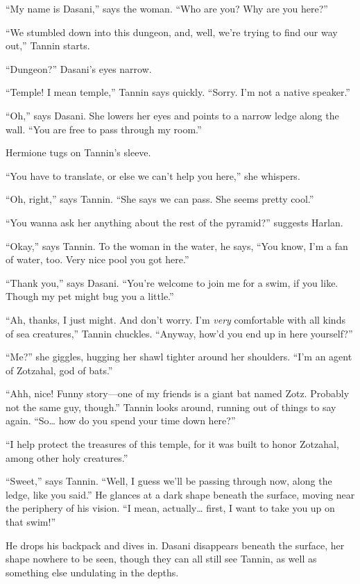 \documentclass[smalldemyvopaper,11pt,twoside,onecolumn,openright,extrafontsizes]{memoir}
\newlength\drop
\begin{document}
``My name is Dasani,'' says the woman. ``Who are you? Why are you
here?''

``We stumbled down into this dungeon, and, well, we're trying to find
our way out,'' Tannin starts.

``Dungeon?'' Dasani's eyes narrow.

``Temple! I mean temple,'' Tannin says quickly. ``Sorry. I'm not a
native speaker.''

``Oh,'' says Dasani. She lowers her eyes and points to a narrow ledge
along the wall. ``You are free to pass through my room.''

Hermione tugs on Tannin's sleeve.

``You have to translate, or else we can't help you here,'' she whispers.

``Oh, right,'' says Tannin. ``She says we can pass. She seems pretty
cool.''

``You wanna ask her anything about the rest of the pyramid?'' suggests
Harlan.

``Okay,'' says Tannin. To the woman in the water, he says, ``You know,
I'm a fan of water, too. Very nice pool you got here.''

``Thank you,'' says Dasani. ``You're welcome to join me for a swim, if
you like. Though my pet might bug you a little.''

``Ah, thanks, I just might. And don't worry. I'm \emph{very} comfortable
with all kinds of sea creatures,'' Tannin chuckles. ``Anyway, how'd you
end up in here yourself?''

``Me?'' she giggles, hugging her shawl tighter around her shoulders.
``I'm an agent of Zotzahal, god of bats.''

``Ahh, nice! Funny story---one of my friends is a giant bat named Zotz.
Probably not the same guy, though.'' Tannin looks around, running out of
things to say again. ``So\ldots{} how do you spend your time down
here?''

``I help protect the treasures of this temple, for it was built to honor
Zotzahal, among other holy creatures.''

``Sweet,'' says Tannin. ``Well, I guess we'll be passing through now,
along the ledge, like you said.'' He glances at a dark shape beneath the
surface, moving near the periphery of his vision. ``I mean,
actually\ldots{} first, I want to take you up on that swim!''

He drops his backpack and dives in. Dasani disappears beneath the
surface, her shape nowhere to be seen, though they can all still see
Tannin, as well as something else undulating in the depths.
\end{document}
